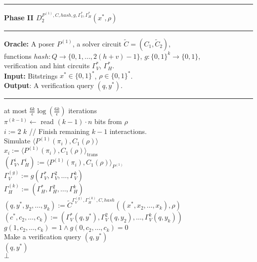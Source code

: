 \begin{codeblock}
  \medskip \hrule \medskip
  \textbf{Phase II $D_2^{P^{(1)}, C, hash, g, \Gamma_V^*, \Gamma_H^*}(x^*, \rho)$}
  \medskip \hrule \medskip
  \textbf{Oracle:} A poser $P^{(1)}$, a solver circuit $\widetilde{C} = (C_1, \widetilde{C}_2)$, \\
  \IndII functions $hash : Q \rightarrow \{0,1, \dots, 2(h+v)-1\}$, $g:\{0,1\}^k \rightarrow \{0,1\}$, \\
  \IndII verification and hint circuits $\Gamma_V^{*}$, $\Gamma_H^{*}$. \\
  \textbf{Input:} Bitstrings $x^* \in \{0,1\}^{*}$, $\rho \in \{0,1\}^{*}$.\\
  \textbf{Output}: A verification query $(q, y^*)$.
  \medskip \hrule \medskip
  \For at most $\frac{6k}{\epsilon} \log(\frac{6k}{\epsilon})$ iterations \Do \\
  \IndI $\pi^{(k-1)} \leftarrow$ read $(k-1)\cdot n$ bits from $\rho$ \\
  \IndI \For $i:=2$ \To $k$ \Do \IndIII // Finish remaining $k-1$ interactions. \\
  \IndII Simulate $\langle P^{(1)}(\pi_i), C_1(\rho)\rangle$ \\
  \IndIII $ x_i := \langle P^{(1)}(\pi_i), C_1(\rho)\rangle_{\text{trans}}$ \\
  \IndIII $(\Gamma_V^{i}, \Gamma_H^{i}) := \langle P^{(1)}(\pi_i), C_1(\rho) \rangle_{P^{(1)}}$ \\
  \IndI $\Gamma_V^{(g)} := g(\Gamma_V^{*}, \Gamma_V^{2}, \dots, \Gamma_V^{k})$  \\
  \IndI  $\Gamma_H^{(k)} := (\Gamma_H^{*}, \Gamma_H^{2}, \dots, \Gamma_H^{k})$ \\
  \IndI $(q, y^*, y_2, \dots, y_k) := \widetilde{C}^{\Gamma_V^{(g)}, \Gamma_H^{(k)}, C, hash}((x^*, x_2, \dots, x_k), \rho)$\\
  \IndI $(c^*, c_2, \dots, c_k) := (\Gamma_V^*(q, y^*), \Gamma_V^2(q, y_2), \dots, \Gamma_V^{k}(q, y_k))$ \\
  \IndI \If $g(1, c_{2}, \dots, c_k) = 1 \land g(0,c_{2}, \dots, c_k) = 0$ \then \\
  \IndII Make a verification query $(q, y^*)$ \\
  \IndII \return $(q, y^*)$ \\
  \return $\bot$
%
\end{codeblock}
%
